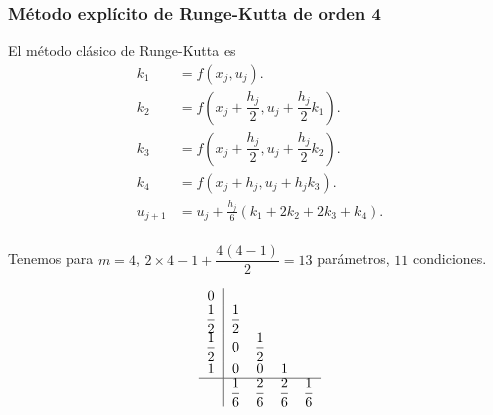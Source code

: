 \begin{frame}
	\frametitle{Método explícito de Runge-Kutta de orden 4}
	El método clásico de Runge-Kutta es
	\begin{align*}
		k_{1}   & = f\left(x_{j},u_{j}\right).                                        \\
		k_{2}   & = f\left(x_{j}+\dfrac{h_{j}}{2},u_{j}+\dfrac{h_{j}}{2}k_{1}\right). \\
		k_{3}   & = f\left(x_{j}+\dfrac{h_{j}}{2},u_{j}+\dfrac{h_{j}}{2}k_{2}\right). \\
		k_{4}   & = f\left(x_{j}+h_{j},u_{j}+h_{j}k_{3}\right).                       \\
		u_{j+1} & = u_{j}+\frac{h_{j}}{6}\left(k_{1}+2k_{2}+2k_{3}+k_{4}\right).      \\
	\end{align*}

	Tenemos para $m=4$, $2\times 4-1+\dfrac{4\left(4-1\right)}{2}=13$
	parámetros, $11$ condiciones.

	\begin{equation*}
		\begin{array}
			{c|cccc}
			0                                                                        \\
			\dfrac{1}{2} & \dfrac{1}{2}                                              \\
			\dfrac{1}{2} & 0            & \dfrac{1}{2}                               \\
			1            & 0            & 0            & 1                           \\
			\hline
			             & \dfrac{1}{6} & \dfrac{2}{6} & \dfrac{2}{6} & \dfrac{1}{6}
		\end{array}
	\end{equation*}
\end{frame}